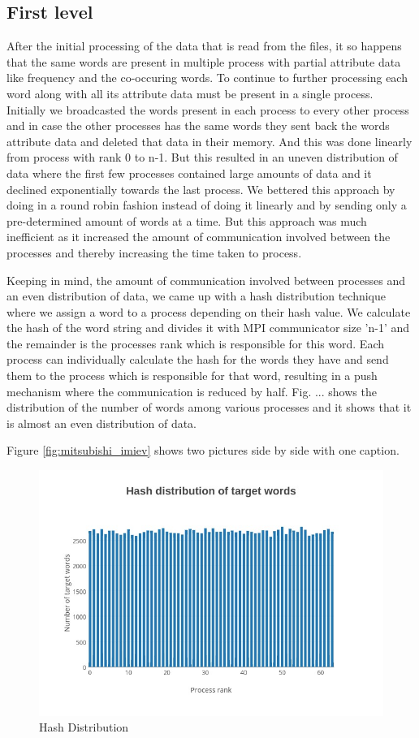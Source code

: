 \documentclass[article,dr=phil,type=drfinal,colorback,accentcolor=tud9c]{tudthesis}
\begin{document}
\subsection{First level}
After the initial processing of the data that is read from the files, it so happens that the same words are present in multiple process with partial attribute data like frequency and the co-occuring words. To continue to further processing each word along with all its attribute data must be present in a single process. Initially we broadcasted the words present in each process to every other process and in case the other processes has the same words they sent back the words attribute data and deleted that data in their memory. And this was done linearly from process with rank 0 to n-1. But this resulted in an uneven distribution of data where the first few processes contained large amounts of data and it declined exponentially towards the last process. We bettered this approach by doing in a round robin fashion instead of doing it linearly and by sending only a pre-determined amount of words at a time. But this approach was much inefficient as it increased the amount of communication involved between the processes and thereby increasing the time taken to process.

Keeping in mind, the amount of communication involved between processes and an even distribution of data, we came up with a hash distribution technique where we assign a word to a process depending on their hash value. We calculate the hash of the word string and divides it with MPI communicator size 'n-1' and the remainder is the processes rank which is responsible for this word. Each process can individually calculate the hash for the words they have and send them to the process which is responsible for that word, resulting in a push mechanism where the communication is reduced by half. Fig. ... shows the distribution of the number of words among various processes and it shows that it is almost an even distribution of data.

Figure \ref{fig:mitsubishi_imiev} shows two pictures side by side with one caption.

\begin{figure}[htb]
	\centering
	\includegraphics[width=150mm]{images/12}
	\caption[Hash Distribution]{Hash Distribution}
	\label{fig:hashdistribution}
\end{figure}
\end{document}

